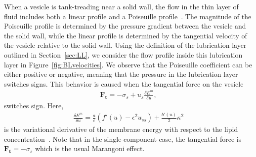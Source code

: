 \documentclass[twoside,twocolumn,9pt]{article}
\renewcommand{\tt}{\mathbf{t}}
\newcommand{\subfigimg}[3][,]{%
  \setbox1=\hbox{\texttt{[image: \#3]}}%
  \leavevmode\rlap{\usebox1}%
  \rlap{\hspace*{0pt}\raisebox{\dimexpr\ht1-0\baselineskip}{\bf
  \normalsize #2}}%
  \phantom{\usebox1}%
}
\begin{document}



When a vesicle is tank-treading near a solid wall, the flow in the thin
layer of fluid includes both a linear profile and a Poiseuille
profile~\cite{mis-wis-ber-key-li-tun-law-per-erd-zha-zha-sun-kal-lam-kon2019}.
The magnitude of the Poiseuille profile is determined by the pressure
gradient between the vesicle and the solid wall, while the linear
profile is determined by the tangential velocity of the vesicle relative
to the solid wall. Using the definition of the lubrication layer
outlined in Section~\ref{sec:LL}, we consider the flow profile inside
this lubrication layer in Figure~\ref{fig:BLvelocities}. We observe that
the Poiseuille coefficient can be either positive or negative, meaning
that the pressure in the lubrication layer switches signs. This behavior
is caused when the tangential force on the vesicle
\begin{align}
  \mathbf{F}_{\tt} = -\sigma_s + u_s \frac{\delta E^m}{\delta u},
\end{align}
switches sign. Here,
\begin{align}
  \frac{\delta E^m}{\delta u} = \frac{a}{\epsilon} 
    (f'(u) - \epsilon^2 u_{ss}) + \frac{b'(u)}{2} \kappa^2
\end{align}
is the variational derivative of the membrane energy with respect to the
lipid concentration~\cite{soh-tse-li-voi-low2010}. Note that in the
single-component case, the tangential force is $\mathbf{F}_\tt =
-\sigma_s$ which is the usual Marangoni effect.
\end{document}
